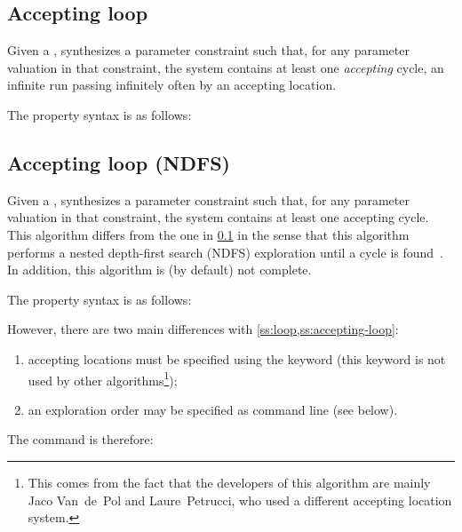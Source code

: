 \subsection{Accepting loop}\label{ss:accepting-loop}
Given a \NIPTA{}, \imitator{} synthesizes a parameter constraint such that, for any parameter valuation in that constraint, the system contains at least one \emph{accepting} cycle, \ie{} an infinite run passing infinitely often by an accepting location.

The property syntax is as follows:



\subsection{Accepting loop (NDFS)}\label{ss:accepting-loop-NDFS}
Given a \NIPTA{}, \imitator{} synthesizes a parameter constraint such that, for any parameter valuation in that constraint, the system contains at least one accepting cycle.
This algorithm differs from the one in \cref{ss:accepting-loop} in the sense that this algorithm performs a nested depth-first search (NDFS) exploration until a cycle is found~\cite{NPP18}.
In addition, this algorithm is (by default) not complete.

The property syntax is as follows:


However, there are two main differences with \cref{ss:loop,ss:accepting-loop}:
\begin{enumerate}
	\item accepting locations must be specified using the keyword  (this keyword is not used by other algorithms\footnote{This comes from the fact that the developers of this algorithm are mainly Jaco Van~de~Pol and Laure~Petrucci, who used a different accepting location system.});
	\item an exploration order may be specified as command line (see below).
\end{enumerate}

The command is therefore:


